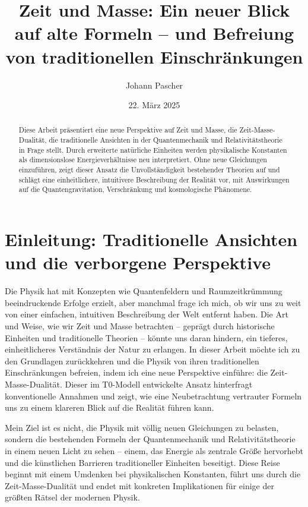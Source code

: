 \documentclass[a4paper,12pt]{article}
\title{Zeit und Masse: Ein neuer Blick auf alte Formeln – und Befreiung von traditionellen Einschränkungen}
\author{Johann Pascher}
\date{22. März 2025}
\begin{document}
	
	\maketitle
	
	\begin{abstract}
		Diese Arbeit präsentiert eine neue Perspektive auf Zeit und Masse, die Zeit-Masse-Dualität, die traditionelle Ansichten in der Quantenmechanik und Relativitätstheorie in Frage stellt. Durch erweiterte natürliche Einheiten werden physikalische Konstanten als dimensionslose Energieverhältnisse neu interpretiert. Ohne neue Gleichungen einzuführen, zeigt dieser Ansatz die Unvollständigkeit bestehender Theorien auf und schlägt eine einheitlichere, intuitivere Beschreibung der Realität vor, mit Auswirkungen auf die Quantengravitation, Verschränkung und kosmologische Phänomene.
	\end{abstract}
	
	\tableofcontents
	\newpage
	
	\section{Einleitung: Traditionelle Ansichten und die verborgene Perspektive}
	
	Die Physik hat mit Konzepten wie Quantenfeldern und Raumzeitkrümmung beeindruckende Erfolge erzielt, aber manchmal frage ich mich, ob wir uns zu weit von einer einfachen, intuitiven Beschreibung der Welt entfernt haben. Die Art und Weise, wie wir Zeit und Masse betrachten – geprägt durch historische Einheiten und traditionelle Theorien – könnte uns daran hindern, ein tieferes, einheitlicheres Verständnis der Natur zu erlangen. In dieser Arbeit möchte ich zu den Grundlagen zurückkehren und die Physik von ihren traditionellen Einschränkungen befreien, indem ich eine neue Perspektive einführe: die Zeit-Masse-Dualität. Dieser im T0-Modell entwickelte Ansatz hinterfragt konventionelle Annahmen und zeigt, wie eine Neubetrachtung vertrauter Formeln uns zu einem klareren Blick auf die Realität führen kann.
	
	Mein Ziel ist es nicht, die Physik mit völlig neuen Gleichungen zu belasten, sondern die bestehenden Formeln der Quantenmechanik und Relativitätstheorie in einem neuen Licht zu sehen – einem, das Energie als zentrale Größe hervorhebt und die künstlichen Barrieren traditioneller Einheiten beseitigt. Diese Reise beginnt mit einem Umdenken bei physikalischen Konstanten, führt uns durch die Zeit-Masse-Dualität und endet mit konkreten Implikationen für einige der größten Rätsel der modernen Physik.
	
\end{document}
